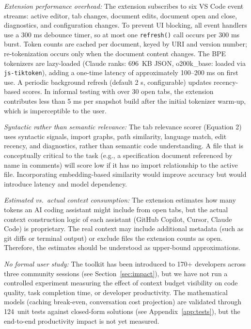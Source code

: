 \documentclass[a4paper,fleqn]{cas-dc}
\begin{document}
\textit{Extension performance overhead:} The extension subscribes to six VS Code event streams: active editor, tab changes, document edits, document open and close, diagnostics, and configuration changes. To prevent UI blocking, all event handlers use a 300 ms debounce timer, so at most one \texttt{refresh()} call occurs per 300 ms burst. Token counts are cached per document, keyed by URI and version number; re-tokenization occurs only when the document content changes. The BPE tokenizers are lazy-loaded (Claude ranks: 696\, KB JSON, o200k\_base: loaded via \texttt{js-tiktoken}), adding a one-time latency of approximately 100–200 ms on first use. A periodic background refresh (default 2 s, configurable) updates recency-based scores. In informal testing with over 30 open tabs, the extension contributes less than 5 ms per snapshot build after the initial tokenizer warm-up, which is imperceptible to the user.

\textit{Syntactic rather than semantic relevance:}
The tab relevance scorer (Equation 2) uses syntactic signals, import graphs, path similarity, language match, edit recency, and diagnostics, rather than semantic code understanding. A file that is conceptually critical to the task (e.g., a specification document referenced by name in comments) will score low if it has no import relationship to the active file. Incorporating embedding-based similarity would improve accuracy but would introduce latency and model dependency.

\textit{Estimated vs.\ actual context consumption:} The extension estimates how many tokens an AI coding assistant might include from open tabs, but the actual context construction logic of each assistant (GitHub Copilot, Cursor, Claude Code) is proprietary. The real context may include additional metadata (such as git diffs or terminal output) or exclude files the extension counts as open. Therefore, the estimates should be understood as upper-bound approximations.

\textit{No formal user study:} The toolkit has been introduced to 170+ developers across three community sessions (see Section~\ref{sec:impact}), but we have not run a controlled experiment measuring the effect of context budget visibility on code quality, task completion time, or developer productivity. The mathematical models (caching break-even, conversation cost projection) are validated through 124~unit tests against closed-form solutions (see Appendix~\ref{app:tests}), but the end-to-end productivity impact is not yet measured.
\end{document}
